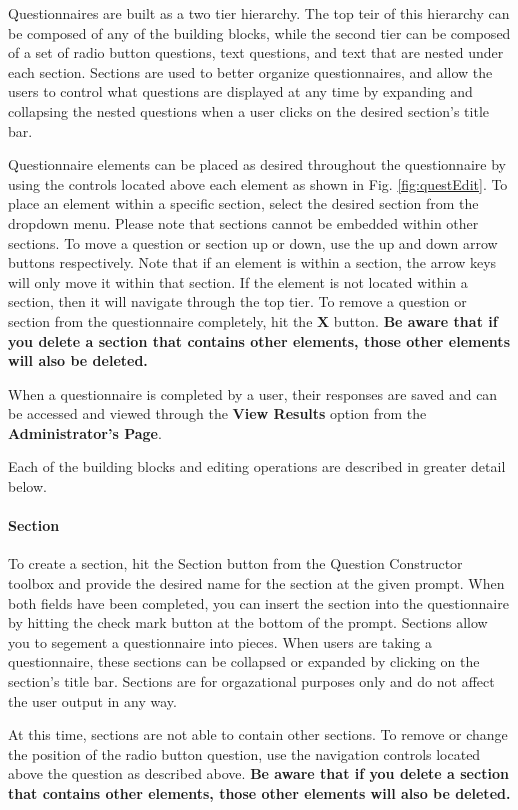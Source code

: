 \documentclass[article]{ij4uq}              %
\begin{document}
Questionnaires are built as a two tier hierarchy.  The top teir of this hierarchy can be composed of any of the building blocks, while the second tier can be composed of a set of radio button questions, text questions, and text that are nested under each section.  Sections are used to better organize questionnaires, and allow the users to control what questions are displayed at any time by expanding and collapsing the nested questions when a user clicks on the desired section's title bar.  

Questionnaire elements can be placed as desired throughout the questionnaire by using the controls located above each element as shown in Fig. \ref{fig:questEdit}.  To place an element within a specific section, select the desired section from the dropdown menu.  Please note that sections cannot be embedded within other sections.  To move a question or section up or down, use the up and down arrow buttons respectively.  Note that if an element is within a section, the arrow keys will only move it within that section. If the element is not located within a section, then it will navigate through the top tier.  To remove a question or section from the questionnaire completely, hit the \textbf{X} button.  \textbf{Be aware that if you delete a section that contains other elements, those other elements will also be deleted.}

When a questionnaire is completed by a user, their responses are saved and can be accessed and viewed through the \textbf{View Results} option from the \textbf{Administrator's Page}.

 Each of the building blocks and editing operations are described in greater detail below.

\paragraph{Section}
To create a section, hit the Section button from the Question Constructor toolbox and provide the desired name for the section at the given prompt.  When both fields have been completed, you can insert the section into the questionnaire by hitting the check mark button at the bottom of the prompt.  Sections allow you to segement a questionnaire into pieces.  When users are taking a questionnaire, these sections can be collapsed or expanded by clicking on the section's title bar.  Sections are for orgazational purposes only and do not affect the user output in any way.

At this time, sections are not able to contain other sections.  To remove or change the position of the radio button question, use the navigation controls located above the question as described above. \textbf{Be aware that if you delete a section that contains other elements, those other elements will also be deleted.}
\end{document}

